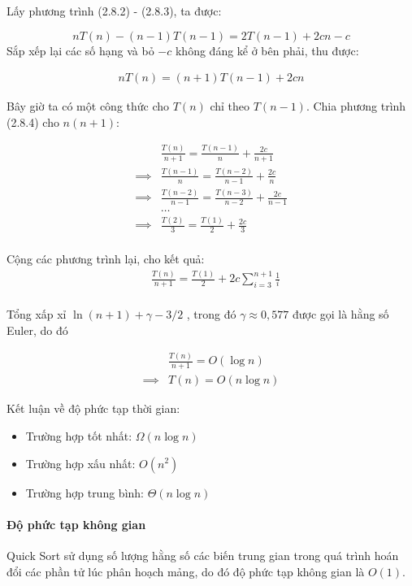 Lấy phương trình (2.8.2) - (2.8.3), ta được:

$$nT(n)-(n-1)T(n-1)=2T(n-1)+2cn-c $$
Sắp xếp lại các số hạng và bỏ $-c$ không đáng kể ở bên phải, thu được: 

\begin{align*}
    nT(n)=(n+1)T(n-1)+2cn \tag{2.8.4}
\end{align*}

Bây giờ ta có một công thức cho $T(n)$ chỉ theo $T(n - 1)$. Chia phương trình (2.8.4) cho $n(n + 1)$: 

\begin{align*}
&\frac{T(n)}{n+1}=\frac{T(n-1)}{n}+\frac{2c}{n+1} \\
\implies &\frac{T(n-1)}{n}=\frac{T(n-2)}{n-1}+\frac{2c}{n} \\
\implies &\frac{T(n-2)}{n-1}=\frac{T(n-3)}{n-2}+\frac{2c}{n-1} \\
&\dots \\
\implies &\frac{T(2)}{3}=\frac{T(1)}{2}+\frac{2c}{3} \\
\end{align*}

Cộng các phương trình lại, cho kết quả:
\begin{align*}
&\frac{T(n)}{n+1}=\frac{T(1)}{2}+2c\sum_{i=3}^{n+1}\frac{1}{i} \tag{7.23} \\
\end{align*}

Tổng xấp xỉ $\ln(n + 1) + \gamma - 3/2$ , trong đó $\gamma \approx 0,577$ được gọi là hằng số Euler, do đó 

\begin{align*}
    &\frac{T(n)}{n+1}=O(\log n) \\
    \implies &T(n)=O(n \log n) 
\end{align*}


Kết luận về độ phức tạp thời gian:

 \begin{itemize}
    \item Trường hợp tốt nhất: $\Omega(n\log{n})$ 
    \item Trường hợp xấu nhất: $O(n^2)$
    \item Trường hợp trung bình: $\Theta(n\log{n})$
\end{itemize}
\paragraph{Độ phức tạp không gian}
Quick Sort sử dụng số lượng hằng số các biến trung gian trong quá trình hoán đổi các phần tử lúc phân hoạch mảng, do đó độ phức tạp không gian là $O(1)$.



